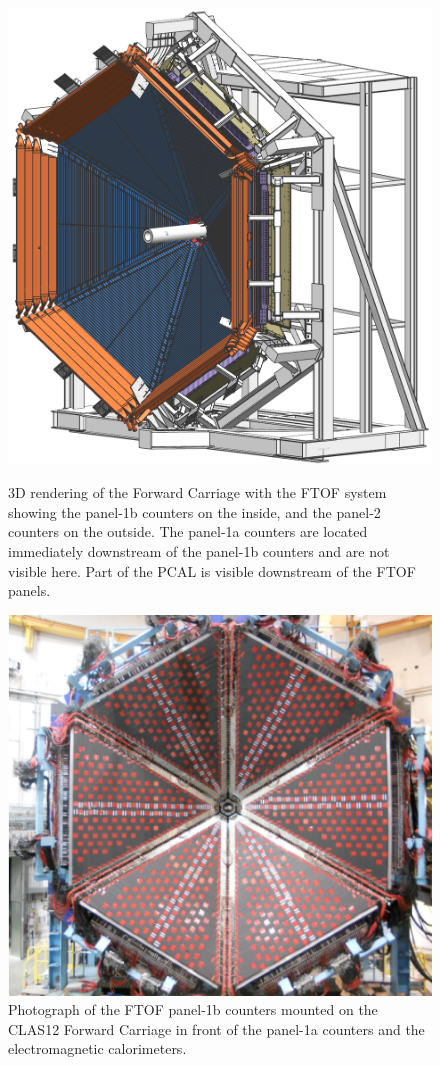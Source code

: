 \documentclass[final,3p,twocolumn]{elsarticle}
\begin{document}
\begin{figure}[t!]
\includegraphics[width=0.95\columnwidth]{fwd_carriage-1.png}
\caption{3D rendering of the Forward Carriage with the FTOF system showing the panel-1b counters on the
inside, and the panel-2 counters on the outside. The panel-1a counters are located immediately downstream of the
panel-1b counters and are not visible here. Part of the PCAL is visible downstream of the FTOF panels.}
\label{ftof-model}
\vspace{0.5cm} \includegraphics[width=1.0\columnwidth]{FTOF-1b.png}
\caption{Photograph of the FTOF panel-1b counters mounted on the CLAS12 Forward Carriage in front of the
  panel-1a counters and the electromagnetic calorimeters.} 
\label{ftof-1b}
\end{figure}
\end{document}
